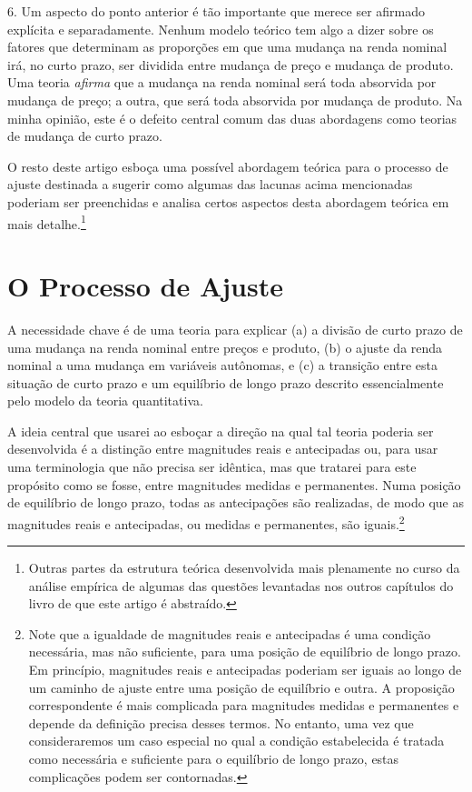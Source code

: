 \documentclass[12pt]{article}
\begin{document}
6. Um aspecto do ponto anterior é tão importante que merece ser afirmado explícita e separadamente. Nenhum modelo teórico tem algo a dizer sobre os fatores que determinam as proporções em que uma mudança na renda nominal irá, no curto prazo, ser dividida entre mudança de preço e mudança de produto. Uma teoria \textit{afirma} que a mudança na renda nominal será toda absorvida por mudança de preço; a outra, que será toda absorvida por mudança de produto. Na minha opinião, este é o defeito central comum das duas abordagens como teorias de mudança de curto prazo.

O resto deste artigo esboça uma possível abordagem teórica para o processo de ajuste destinada a sugerir como algumas das lacunas acima mencionadas poderiam ser preenchidas e analisa certos aspectos desta abordagem teórica em mais detalhe.\footnote{Outras partes da estrutura teórica desenvolvida mais plenamente no curso da análise empírica de algumas das questões levantadas nos outros capítulos do livro de que este artigo é abstraído.}

\section{O Processo de Ajuste}

A necessidade chave é de uma teoria para explicar (a) a divisão de curto prazo de uma mudança na renda nominal entre preços e produto, (b) o ajuste da renda nominal a uma mudança em variáveis autônomas, e (c) a transição entre esta situação de curto prazo e um equilíbrio de longo prazo descrito essencialmente pelo modelo da teoria quantitativa.

A ideia central que usarei ao esboçar a direção na qual tal teoria poderia ser desenvolvida é a distinção entre magnitudes reais e antecipadas ou, para usar uma terminologia que não precisa ser idêntica, mas que tratarei para este propósito como se fosse, entre magnitudes medidas e permanentes. Numa posição de equilíbrio de longo prazo, todas as antecipações são realizadas, de modo que as magnitudes reais e antecipadas, ou medidas e permanentes, são iguais.\footnote{Note que a igualdade de magnitudes reais e antecipadas é uma condição necessária, mas não suficiente, para uma posição de equilíbrio de longo prazo. Em princípio, magnitudes reais e antecipadas poderiam ser iguais ao longo de um caminho de ajuste entre uma posição de equilíbrio e outra. A proposição correspondente é mais complicada para magnitudes medidas e permanentes e depende da definição precisa desses termos. No entanto, uma vez que consideraremos um caso especial no qual a condição estabelecida é tratada como necessária e suficiente para o equilíbrio de longo prazo, estas complicações podem ser contornadas.}
\end{document}
